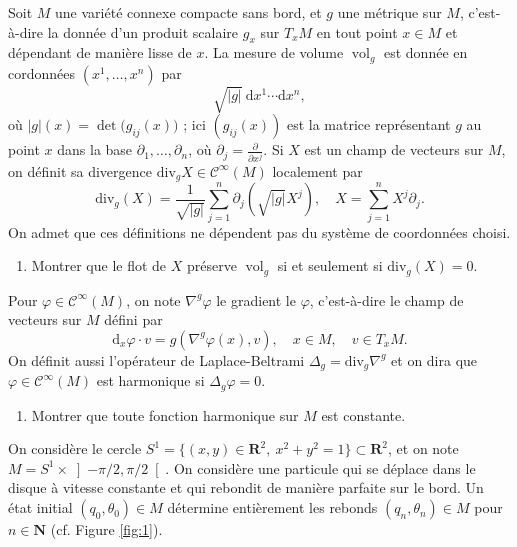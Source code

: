 \documentclass[a4paper,10pt,openany]{article}
\theoremstyle{plain}
\theoremstyle{definition}
\newcommand{\dd}{\mathrm{d}}
\newcommand{\vol}{\operatorname{vol}}
\newcommand{\R}{\mathbf{R}}
\newcommand{\N}{\mathbf{N}}
\begin{document}
\noindent Soit $M$ une vari\'et\'e connexe compacte sans bord, et $g$ une m\'etrique sur $M$, c'est-\`a-dire la donn\'ee d'un produit scalaire $g_x$ sur $T_xM$ en tout point $x\in M$ et d\'ependant de mani\`ere lisse de $x$. La mesure de volume $\vol_g$ est donn\'ee en cordonn\'ees $(x^1, \dots, x^n)$ par 
$$
\sqrt{|g|}~ \dd x^1 \cdots \dd x^n,
$$
o\`u $|g|(x) = \displaystyle{\det\bigl(g_{ij}(x)\bigr)}$ ; ici $(g_{ij}(x))$ est la matrice repr\'esentant $g$ au point $x$ dans la base $\partial_1, \dots, \partial_n$, o\`u $\partial_j = \displaystyle{\frac{\partial}{\partial x^j}}$. Si $X$ est un champ de vecteurs sur $M$, on d\'efinit sa divergence $\mathrm{div}_g X \in \mathcal{C}^\infty(M)$ localement par
$$
\mathrm{div}_g(X) = \frac{1}{\sqrt{|g|}}\sum_{j=1}^n \partial_j \left(\sqrt{|g|}X^j\right), \quad X = \sum_{j=1}^n X^j \partial_j.
$$
On admet que ces d\'efinitions ne d\'ependent pas du syst\`eme de coordonn\'ees choisi.
\begin{enumerate}
\item Montrer que le flot de $X$ pr\'eserve $\vol_g$ si et seulement si $\mathrm{div}_g(X) = 0$.
\end{enumerate}
Pour $\varphi \in \mathcal{C}^\infty(M)$, on note $\nabla^g \varphi$ le gradient le $\varphi$, c'est-\`a-dire le champ de vecteurs sur $M$ d\'efini par 
$$
\dd_x \varphi \cdot v = g(\nabla^g \varphi (x),v), \quad x \in M, \quad v \in T_xM.
$$
On d\'efinit aussi l'op\'erateur de Laplace-Beltrami $\Delta_g = \mathrm{div}_g \nabla^g$ et on dira que $\varphi \in \mathcal{C}^\infty(M)$ est harmonique si $\Delta_g \varphi = 0$.
\begin{enumerate}[resume]
\item Montrer que toute fonction harmonique sur $M$ est constante.
\end{enumerate}
\vspace{0.6cm}


 \vspace{1.5mm} 

\noindent On consid\`ere le cercle $S^1 = \bigl\{(x,y) \in \R^2, ~x^2 + y^2 = 1\bigr\} \subset \R^2$, et on note $M = S^1 \times \left]-\pi/2, \pi/2\right[$. On consid\`ere une particule qui se d\'eplace dans le disque \`a vitesse constante et qui rebondit de mani\`ere parfaite sur le bord. Un \'etat initial $(q_0, \theta_0) \in M$ d\'etermine enti\`erement les rebonds $(q_n, \theta_n) \in M$ pour $n \in \N$ (cf. Figure \ref{fig:1}).
\end{document}
